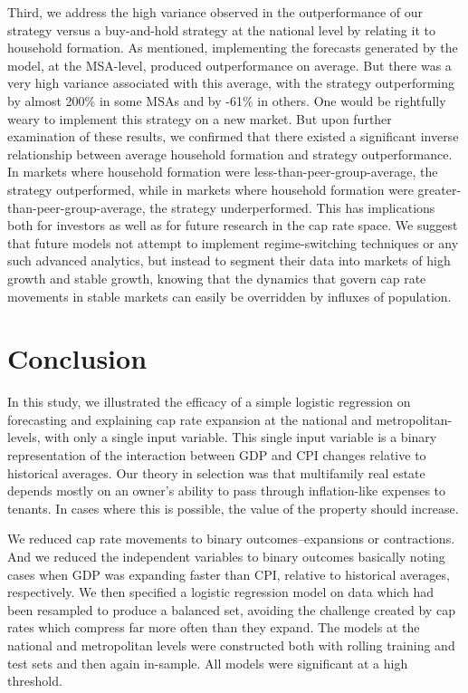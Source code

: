 Third, we address the high variance observed in the outperformance of our strategy versus a buy-and-hold strategy at the national level by relating it to household formation. As mentioned, implementing the forecasts generated by the model, at the MSA-level, produced outperformance on average. But there was a very high variance associated with this average, with the strategy outperforming by almost 200\% in some MSAs and by -61\% in others. One would be rightfully weary to implement this strategy on a new market. But upon further examination of these results, we confirmed that there existed a significant inverse relationship between average household formation and strategy outperformance. In markets where household formation were less-than-peer-group-average, the strategy outperformed, while in markets where household formation were greater-than-peer-group-average, the strategy underperformed. This has implications both for investors as well as for future research in the cap rate space. We suggest that future models not attempt to implement regime-switching techniques or any such advanced analytics, but instead to segment their data into markets of high growth and stable growth, knowing that the dynamics that govern cap rate movements in stable markets can easily be overridden by influxes of population. 


\section{Conclusion}

In this study, we illustrated the efficacy of a simple logistic regression on forecasting and explaining cap rate expansion at the national and metropolitan-levels, with only a single input variable. This single input variable is a binary representation of the interaction between GDP and CPI changes relative to historical averages. Our theory in selection was that multifamily real estate depends mostly on an owner's ability to pass through inflation-like expenses to tenants. In cases where this is possible, the value of the property should increase.

We reduced cap rate movements to binary outcomes--expansions or contractions. And we reduced the independent variables to binary outcomes basically noting cases when GDP was expanding faster than CPI, relative to historical averages, respectively. We then specified a logistic regression model on data which had been resampled to produce a balanced set, avoiding the challenge created by cap rates which compress far more often than they expand. The models at the national and metropolitan levels were constructed both with rolling training and test sets and then again in-sample. All models were significant at a high threshold. 

